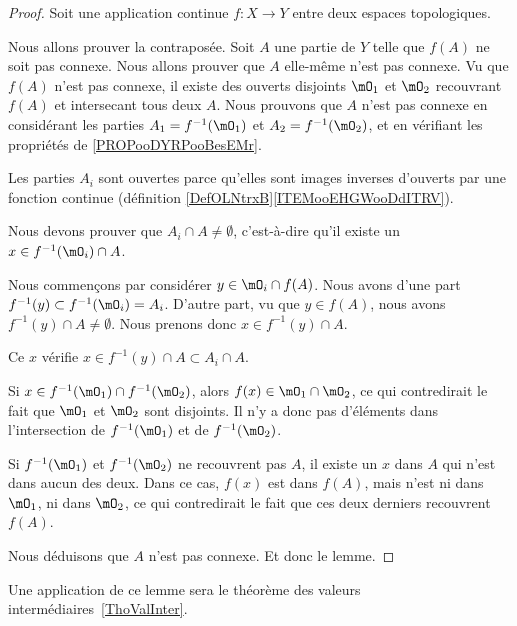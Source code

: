 \begin{proof}
	Soit une application continue \(f \colon X\to Y  \) entre deux espaces topologiques.

	Nous allons prouver la contraposée. Soit \( A\) une partie de \( Y\) telle que \( f(A)\) ne soit pas connexe. Nous allons prouver que \( A\) elle-même n'est pas connexe. Vu que \( f(A)\) n'est pas connexe, il existe des ouverts disjoints \( \mO_1\) et \( \mO_2\) recouvrant \( f(A)\) et intersecant tous deux \( A\). Nous prouvons que \( A\) n'est pas connexe en considérant les parties  \( A_1=f^{-1}(\mO_1)\) et \( A_2=f^{-1}(\mO_2)\), et en vérifiant les propriétés de \ref{PROPooDYRPooBesEMr}.

	\begin{subproof}
		Les parties \( A_i\) sont ouvertes parce qu'elles sont images inverses d'ouverts par une fonction continue (définition \ref{DefOLNtrxB}\ref{ITEMooEHGWooDdITRV}).

		Nous devons prouver que \( A_i\cap A\neq \emptyset\), c'est-à-dire qu'il existe un \( x\in f^{-1}(\mO_i)\cap A\).

		Nous commençons par considérer \( y\in \mO_i\cap f(A)\). Nous avons d'une part \( f^{-1}(y)\subset f^{-1}(\mO_i)=A_i\). D'autre part, vu que \( y\in f(A)\), nous avons \( f^{-1}(y)\cap A\neq \emptyset\). Nous prenons donc \( x\in f^{-1}(y)\cap A\).

		Ce \( x\) vérifie \( x\in f^{-1}(y)\cap A\subset A_i\cap A\).

		Si \( x\in f^{-1}(\mO_1)\cap f^{-1}(\mO_2)\), alors \( f(x)\in \mO_1\cap\mO_2\), ce qui contredirait le fait que \( \mO_1\) et \( \mO_2\) sont disjoints. Il n'y a donc pas d'éléments dans l'intersection de \( f^{-1}(\mO_1)\) et de \( f^{-1}(\mO_2)\).

		Si \( f^{-1}(\mO_1)\) et \( f^{-1}(\mO_2)\) ne recouvrent pas \( A\), il existe un \( x\) dans \( A\) qui n'est dans aucun des deux. Dans ce cas, \( f(x)\) est dans \( f(A)\), mais n'est ni dans \( \mO_1\), ni dans \( \mO_2\), ce qui contredirait le fait que ces deux derniers recouvrent \( f(A)\).
	\end{subproof}
	Nous déduisons que \( A\) n'est pas connexe. Et donc le lemme.
\end{proof}
Une application de ce lemme sera le théorème des valeurs intermédiaires~\ref{ThoValInter}.


